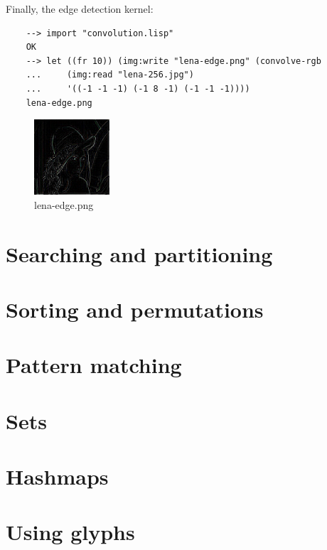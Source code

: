 Finally, the edge detection kernel:

\begin{Verbatim}
    --> import "convolution.lisp"
    OK
    --> let ((fr 10)) (img:write "lena-edge.png" (convolve-rgb
    ...     (img:read "lena-256.jpg")
    ...     '((-1 -1 -1) (-1 8 -1) (-1 -1 -1))))
    lena-edge.png
\end{Verbatim}

\begin{figure}[h]
    \caption{lena-edge.png}
    \centering
    \includegraphics[width=0.25\textwidth]{figures/lena-edge.png}
\end{figure}

\section{Searching and partitioning}

\section{Sorting and permutations}

\section{Pattern matching}

\section{Sets}

\section{Hashmaps}

\section{Using glyphs}
